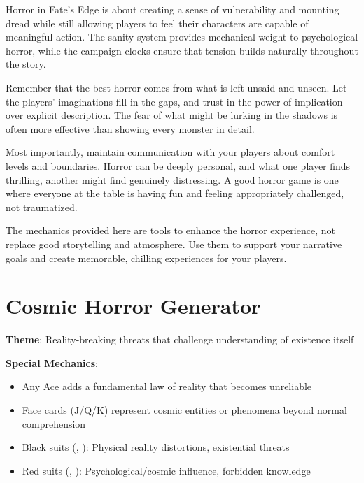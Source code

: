 \documentclass[11pt]{article}
\begin{document}
Horror in Fate's Edge is about creating a sense of vulnerability and mounting dread while still allowing players to feel their characters are capable of meaningful action. The sanity system provides mechanical weight to psychological horror, while the campaign clocks ensure that tension builds naturally throughout the story.

Remember that the best horror comes from what is left unsaid and unseen. Let the players' imaginations fill in the gaps, and trust in the power of implication over explicit description. The fear of what might be lurking in the shadows is often more effective than showing every monster in detail.

Most importantly, maintain communication with your players about comfort levels and boundaries. Horror can be deeply personal, and what one player finds thrilling, another might find genuinely distressing. A good horror game is one where everyone at the table is having fun and feeling appropriately challenged, not traumatized.

The mechanics provided here are tools to enhance the horror experience, not replace good storytelling and atmosphere. Use them to support your narrative goals and create memorable, chilling experiences for your players.

\section*{Cosmic Horror Generator}

\begin{mdframed}[backgroundcolor=horrorbg]
\textbf{Theme}: Reality-breaking threats that challenge understanding of existence itself

\textbf{Special Mechanics}:
\begin{itemize}[leftmargin=*]
\item Any Ace adds a fundamental law of reality that becomes unreliable
\item Face cards (J/Q/K) represent cosmic entities or phenomena beyond normal comprehension
\item Black suits (\spadesuit, \clubsuit): Physical reality distortions, existential threats
\item Red suits (\heartsuit, \diamondsuit): Psychological/cosmic influence, forbidden knowledge
\end{itemize}
\end{mdframed}
\end{document}
